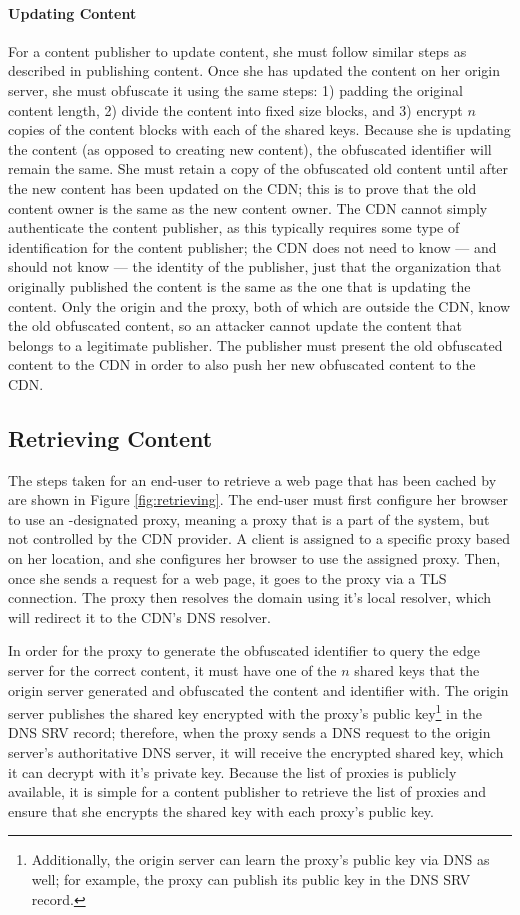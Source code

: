 \paragraph{Updating Content}
For a content publisher to update content, she must follow similar steps as described in publishing content.  
Once she has updated the content on her origin server, she must obfuscate it using the same steps: 1) padding the 
original content length, 2) divide the content into fixed size blocks, and 3) encrypt $n$ copies of the content blocks 
with each of the shared keys.  Because she is updating the content (as opposed to creating new content), the 
obfuscated identifier will remain the same.  She must 
retain a copy of the obfuscated old content until after the new content has been updated on the CDN; this is to prove 
that the old content owner is the same as the new content owner.  The CDN cannot simply authenticate the content publisher, as this 
typically requires some type of identification for the content publisher; the CDN does not need to know --- and should not know --- 
the identity of the publisher, just that the organization that originally published the content is the same as the one that is 
updating the content.  Only the origin and the proxy, both of which are 
outside the CDN, know the old obfuscated content, so an attacker cannot update the content that belongs to 
a legitimate publisher.  The publisher must present the old obfuscated content to the CDN in order to also push 
her new obfuscated content to the CDN. 

\subsection{Retrieving Content}
The steps taken for an end-user to retrieve a web page that has been cached by \system{} are shown in Figure \ref{fig:retrieving}.  
The end-user must first configure her browser to use an \system{}-designated proxy, meaning a proxy that is a part of the system, but not controlled by the 
CDN provider.  A client is assigned to a 
specific proxy based on her location, and she configures her browser to use the assigned proxy.    Then, once she sends a request for a 
web page, it goes to the proxy via a TLS connection.  The proxy then resolves the domain using it's local resolver, which will 
redirect it to the CDN's DNS resolver. 

In order for the proxy to generate the obfuscated identifier to query the edge server for the correct content, 
it must have one of the $n$ shared keys that the origin server generated and obfuscated the content and identifier 
with.  The origin server publishes the shared key encrypted with the proxy's public key\footnote{Additionally, the origin server 
can learn the proxy's public key via DNS as well; for example, the proxy can publish its public key in the DNS SRV record.} in the DNS SRV record; therefore, 
when the proxy sends a DNS request to the origin server's authoritative DNS server, it will receive the encrypted shared 
key, which it can decrypt with it's private key.  Because the list of \system{} proxies is publicly available, it is simple for a 
content publisher to retrieve the list of proxies and ensure that she encrypts the shared key with each proxy's public key.

